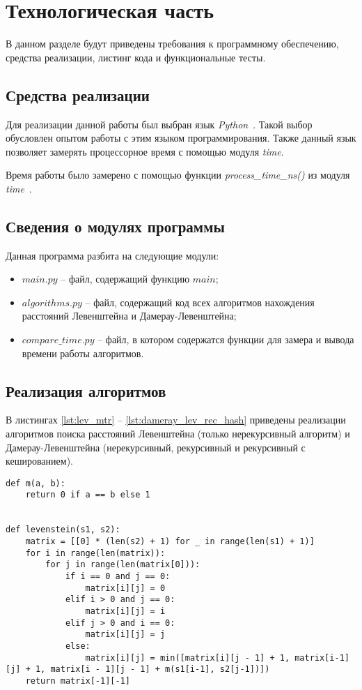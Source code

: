 \chapter{Технологическая часть}

В данном разделе будут приведены требования к программному обеспечению, средства реализации, листинг кода и функциональные тесты.

\section{Средства реализации}

Для реализации данной работы был выбран язык \textit{Python}~\cite{python}. Такой выбор обусловлен опытом работы с этим языком программирования. Также данный язык позволяет замерять процессорное время с помощью модуля \textit{time}.

Время работы было замерено с помощью функции \textit{process\_time\_ns()} из модуля \textit{time}~\cite{python-time}.

\section{Сведения о модулях программы}

Данная программа разбита на следующие модули:
\begin{itemize}
	\item $main.py$ -- файл, содержащий функцию $main$;
	\item $algorithms.py$ -- файл, содержащий код всех алгоритмов нахождения расстояний Левенштейна и Дамерау-Левенштейна;
	\item $compare\_time.py$ -- файл, в котором содержатся функции для замера и вывода времени работы алгоритмов.
\end{itemize}

\section{Реализация алгоритмов}

В листингах \ref{lst:lev_mtr} -- \ref{lst:dameray_lev_rec_hash} приведены реализации алгоритмов поиска расстояний Левенштейна (только нерекурсивный алгоритм) и Дамерау-Левенштейна (нерекурсивный, рекурсивный и рекурсивный с кешированием).

\clearpage

\begin{lstlisting}[label=lst:lev_mtr,caption=Функция нахождения расстояния Левенштейна с использованием матрицы]
def m(a, b):
	return 0 if a == b else 1


def levenstein(s1, s2):
	matrix = [[0] * (len(s2) + 1) for _ in range(len(s1) + 1)]
	for i in range(len(matrix)):
		for j in range(len(matrix[0])):
			if i == 0 and j == 0:
				matrix[i][j] = 0
			elif i > 0 and j == 0:
				matrix[i][j] = i
			elif j > 0 and i == 0:
				matrix[i][j] = j
			else:
				matrix[i][j] = min([matrix[i][j - 1] + 1, matrix[i-1][j] + 1, matrix[i - 1][j - 1] + m(s1[i-1], s2[j-1])])
	return matrix[-1][-1]
\end{lstlisting}

